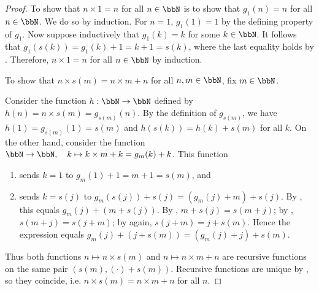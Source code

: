 \begin{proof}
To show that $n \times 1 = n$ for all $n \in \bbN$ is to show that $g_1(n) = n$ for all $n \in \bbN$. We do so by induction. For $n = 1$, $g_1(1) = 1$ by the defining property of $g_1$. Now suppose inductively that $g_1(k) = k$ for some $k \in \bbN$. It follows that $g_1(s(k)) = g_1(k) + 1 = k + 1 = s(k)$, where the last equality holds by . Therefore, $n \times 1 = n$ for all $n \in \bbN$ by induction.

To show that $n \times s(m) = n \times m + n$ for all $n, m \in \bbN$, fix $m \in \bbN$.

Consider the function $h: \bbN \to \bbN$ defined by $h(n) = n \times s(m) = g_{s(m)}(n)$. By the definition of $g_{s(m)}$, we have $h(1) = g_{s(m)}(1) = s(m)$ and $h(s(k)) = h(k) + s(m)$ for all $k$. On the other hand, consider the function $\bbN \to \bbN, \quad k \mapsto k \times m + k = g_m(k) + k$. This function
\begin{enumerate}
    \item sends $k = 1$ to $g_m(1) + 1 = m + 1 = s(m)$, and
    \item sends $k = s(j)$ to $g_m(s(j)) + s(j) = (g_m(j) + m) + s(j)$. By , this equals $g_m(j) + (m + s(j))$. By , $m + s(j) = s(m + j)$; by , $s(m + j) = s(j + m)$; by  again, $s(j + m) = j + s(m)$. Hence the expression equals $g_m(j) + (j + s(m)) = (g_m(j) + j) + s(m)$.
\end{enumerate}
Thus both functions $n \mapsto n \times s(m)$ and $n \mapsto n \times m + n$ are recursive functions on the same pair $(s(m), (\cdot) + s(m))$. Recursive functions are unique by , so they coincide, i.e. $n \times s(m) = n \times m + n$ for all $n$.
\end{proof}
